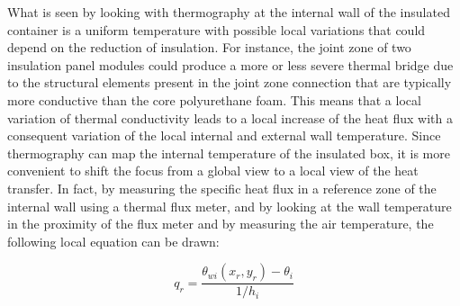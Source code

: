 \documentclass{tQRT2e}
\begin{document}
What is seen by looking with thermography at the internal wall of the insulated container is a uniform temperature with possible local variations that could depend on the reduction of insulation. For instance, the joint zone of two insulation panel modules could produce a more or less severe thermal bridge due to the structural elements present in the joint zone connection that are typically more conductive than the core polyurethane foam. This means that a local variation of thermal conductivity leads to a local increase of the heat flux with a consequent variation of the local internal and external wall temperature. Since thermography can map the internal temperature of the insulated box, it is more convenient to shift the focus from a global view to a local view of the heat transfer. In fact, by measuring the specific heat flux in a reference zone of the internal wall using a thermal flux meter, and by looking at the wall temperature in the proximity of the flux meter and by measuring the air temperature, the following local equation can be drawn:

\begin{equation}
q_r=\frac{\theta_{wi}(x_r,y_r )-\theta_i}{1/h_i}
\end{equation}
\end{document}
